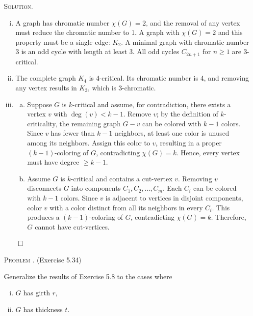 \documentclass[12pt, a4paper, oneside]{ctexart}
\newcounter{problemname}
\newenvironment{problem}{\begin{framed}\stepcounter{problemname}\par\noindent\textsc{Problem \arabic{problemname}. }}{\end{framed}\par}
\newenvironment{solution}{%
	\par\noindent\textsc{Solution. }\ignorespaces
}{%
	\hfill$\qed$\par
}
\begin{document}
	\begin{solution}
		\begin{enumerate}[(i)]
			\item A graph has chromatic number \( \chi(G) = 2 \), and the removal of any vertex must reduce the 
			chromatic number to 1. A graph with \( \chi(G) = 2 \) and this property must be a single edge: \( K_2 \).
			A minimal graph with chromatic number 3 is an odd cycle with length at least 3. All odd cycles \( C_{2n+1} \) for \( n \geq 1 \) are 3-critical.
			\item The complete graph \( K_4 \) is 4-critical. Its chromatic number is 4, and removing any vertex results in \( K_3 \), which is 3-chromatic.
			\item 
			\begin{enumerate}[(a)]
				\item  Suppose \( G \) is \( k \)-critical and assume, for contradiction, there exists a vertex \( v \) with \( \deg(v) < k-1 \). Remove \( v \); by the definition of \( k \)-criticality, the remaining graph \( G - v \) can be colored with \( k-1 \) colors. Since \( v \) has fewer than \( k-1 \) neighbors, at least one color is unused among its neighbors. Assign this color to \( v \), resulting in a proper \( (k-1) \)-coloring of \( G \), contradicting \( \chi(G) = k \). Hence, every vertex must have degree \( \geq k-1 \).
				\item  Assume \( G \) is \( k \)-critical and contains a cut-vertex \( v \). Removing \( v \) disconnects \( G \) into components \( C_1, C_2, \ldots, C_m \). Each \( C_i \) can be colored with \( k-1 \) colors. Since \( v \) is adjacent to vertices in disjoint components, color \( v \) with a color distinct from all its neighbors in every \( C_i \). This produces a \( (k-1) \)-coloring of \( G \), contradicting \( \chi(G) = k \). Therefore, \( G \) cannot have cut-vertices.
			\end{enumerate}
		\end{enumerate}
	\end{solution}

	\begin{problem}
        (Exercise 5.34) 
        
		Generalize the results of Exercise 5.8 to the cases where
		\begin{enumerate}[(i)]
			\item \( G \) has girth \( r \),
			\item \( G \) has thickness \( t \).
		\end{enumerate}

	\end{problem}
	
\end{document}
